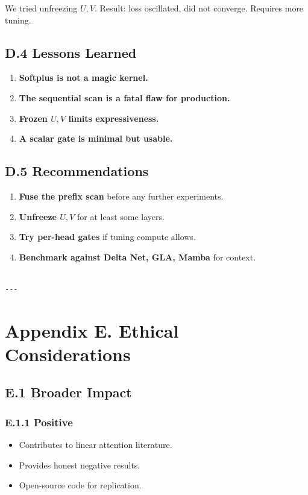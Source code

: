 We tried unfreezing $U, V$. Result: loss oscillated, did not converge. 
Requires more tuning.

\subsection{D.4 Lessons Learned}

\begin{enumerate}
\item \textbf{Softplus is not a magic kernel.}
\item \textbf{The sequential scan is a fatal flaw for production.}
\item \textbf{Frozen $U, V$ limits expressiveness.}
\item \textbf{A scalar gate is minimal but usable.}

\end{enumerate}
\subsection{D.5 Recommendations}

\begin{enumerate}
\item \textbf{Fuse the prefix scan} before any further experiments.
\item \textbf{Unfreeze $U, V$} for at least some layers.
\item \textbf{Try per-head gates} if tuning compute allows.
\item \textbf{Benchmark against Delta Net, GLA, Mamba} for context.
\end{enumerate}
\begin{lstlisting}

---
\end{lstlisting}


\section{Appendix E. Ethical Considerations}

\subsection{E.1 Broader Impact}

\subsubsection{E.1.1 Positive}

\begin{itemize}
\item Contributes to linear attention literature.
\item Provides honest negative results.
\item Open-source code for replication.

\end{itemize}
